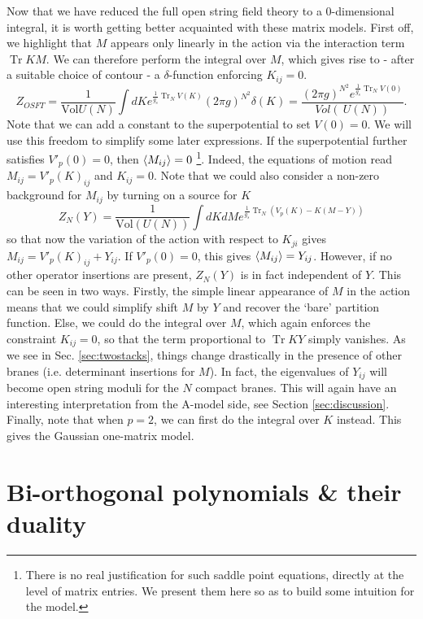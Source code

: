 \documentclass[english]{article}
\DeclareMathOperator{\Tr}{Tr}
\begin{document}
Now that we have reduced the full open string field theory to a $0$-dimensional integral, it is worth getting better acquainted with these matrix models. First off, we highlight that $M$ appears only linearly in the action via the interaction term $\Tr K M$. We can therefore perform the integral over $M$, which gives rise to - after a suitable choice of contour - a $\delta$-function enforcing $K_{ij}=0$.  
\begin{equation}
     Z_{OSFT} = \frac{1}{\text{Vol}  U(N)} \int dK e^{\frac{1}{g_s} \Tr_N V(K)} (2\pi g)^{N^2} \delta(K) =  \frac{(2\pi g)^{N^2} e^{\frac{1}{g_s} \Tr_N V(0)} } {Vol (\ U(N))}.
\end{equation}
Note that we can add a constant to the superpotential to set $V(0)=0$. We will use this freedom to simplify some later expressions. If the superpotential further satisfies $V'_p(0)=0$, then $\Braket{M_{ij}}=0$ \footnote{There is no real justification for such saddle point equations, directly at the level of matrix entries. We present them here so as to build some intuition for the model.}. Indeed, the equations of motion read $M_{ij}=V'_{p}(K)_{ij}$ and $K_{ij}=0$. Note that we could also consider a non-zero background for $M_{ij}$ by turning on a source for $K$
\begin{equation}
    Z_{N}(Y)= \frac{1}{\text{Vol} (U(N))}\int dK dM e^{\frac{1}{g_s} \Tr_{N} \left( V_p(K)-K(M-Y) \right) }
\end{equation}
so that now the variation of the action with respect to $K_{ji}$ gives $M_{ij}=V'_{p}(K)_{ij} +Y_{ij}$. If $V'_p(0)=0$, this gives $\Braket{M_{ij}}=Y_{ij}$. However, if no other operator insertions are present, $Z_{N}(Y)$ is in fact independent of $Y$. This can be seen in two ways. Firstly, the simple linear appearance of $M$ in the action means that we could simplify shift $M$ by $Y$ and recover the `bare' partition function. Else, we could do the integral over $M$, which again enforces the constraint $K_{ij}=0$, so that the term proportional to $\Tr KY$ simply vanishes. As we see in Sec. \ref{sec:twostacks}, things change drastically in the presence of other branes (i.e. determinant insertions for $M$). In fact, the eigenvalues of $Y_{ij}$ will become open string moduli for the $N$ compact branes. This will again have an interesting interpretation from the A-model side, see Section \ref{sec:discussion}.  
Finally, note that when $p=2$, we can first do the integral over $K$ instead. This gives the Gaussian one-matrix model.  


\section{Bi-orthogonal polynomials \& their duality} \label{sec:appPolys}
\end{document}
